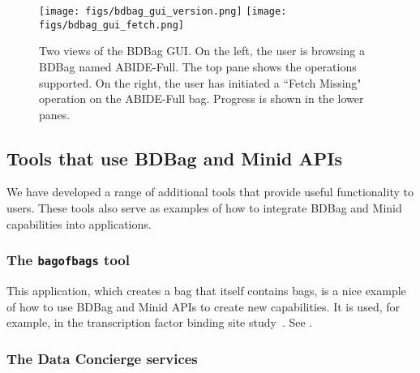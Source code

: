 \documentclass[11pt]{article}
\begin{document}
\begin{figure}[h]

\centering
\texttt{[image: figs/bdbag\_gui\_version.png]}
\texttt{[image: figs/bdbag\_gui\_fetch.png]}
\caption{Two views of the BDBag GUI. 
On the left, the user is browsing a BDBag named ABIDE-Full. The top pane shows the operations
supported. On the right, the user has initiated a ``Fetch Missing" operation on the ABIDE-Full
bag. Progress is shown in the lower panes.\label{fig:gui}}
\end{figure}



\subsection{Tools that use BDBag and Minid APIs}

We have developed a range of additional tools that provide useful functionality to users.
These tools also serve as examples of how to integrate BDBag and Minid
capabilities into applications.

\subsubsection{The \texttt{bagofbags} tool}

This application, which creates a bag that itself contains bags, is a nice example of how to
use BDBag and Minid APIs to create new capabilities.
It is used, for example, in the transcription factor
binding site study~\cite{madduri2018reproducible}.
See .
%

\subsubsection{The Data Concierge services}
\end{document}
